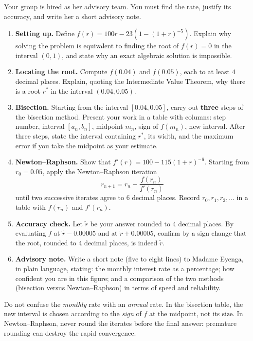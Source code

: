 \documentclass[11pt]{article}
\newcounter{popsec}
\newcounter{popsub}
\newcommand{\courssub}[1]{%
  \stepcounter{popsub}%
  \par\vspace{9pt}\noindent{\popxbold\fontsize{11.5}{13}\selectfont\color{popink}{\color{poporange}\thepopsec.\thepopsub}\hspace{6pt}#1}\par\nopagebreak\vspace{4pt}
}
\begin{document}
Your group is hired as her advisory team. You must find the rate, justify its accuracy, and write her a short advisory note.

\courssub{Tasks}
\begin{enumerate}
\item \textbf{Setting up.} Define $f(r)=100r-23\left(1-(1+r)^{-5}\right)$. Explain why solving the problem is equivalent to finding the root of $f(r)=0$ in the interval $(0,1)$, and state why an exact algebraic solution is impossible.
\item \textbf{Locating the root.} Compute $f(0.04)$ and $f(0.05)$, each to at least $4$ decimal places. Explain, quoting the Intermediate Value Theorem, why there is a root $r^{*}$ in the interval $(0.04,0.05)$.
\item \textbf{Bisection.} Starting from the interval $[0.04,0.05]$, carry out \textbf{three} steps of the bisection method. Present your work in a table with columns: step number, interval $[a_n,b_n]$, midpoint $m_n$, sign of $f(m_n)$, new interval. After three steps, state the interval containing $r^{*}$, its width, and the maximum error if you take the midpoint as your estimate.
\item \textbf{Newton--Raphson.} Show that $f'(r)=100-115(1+r)^{-6}$. Starting from $r_0=0.05$, apply the Newton--Raphson iteration
\[ r_{n+1}=r_n-\frac{f(r_n)}{f'(r_n)} \]
until two successive iterates agree to $6$ decimal places. Record $r_0,r_1,r_2,\dots$ in a table with $f(r_n)$ and $f'(r_n)$.
\item \textbf{Accuracy check.} Let $\tilde{r}$ be your answer rounded to $4$ decimal places. By evaluating $f$ at $\tilde{r}-0.00005$ and at $\tilde{r}+0.00005$, confirm by a sign change that the root, rounded to $4$ decimal places, is indeed $\tilde{r}$.
\item \textbf{Advisory note.} Write a short note (five to eight lines) to Madame Eyenga, in plain language, stating: the monthly interest rate as a percentage; how confident you are in this figure; and a comparison of the two methods (bisection versus Newton--Raphson) in terms of speed and reliability.
\end{enumerate}

\begin{attention}
Do not confuse the \emph{monthly} rate with an \emph{annual} rate. In the bisection table, the new interval is chosen according to the \emph{sign} of $f$ at the midpoint, not its size. In Newton--Raphson, never round the iterates before the final answer: premature rounding can destroy the rapid convergence.
\end{attention}
\end{document}

